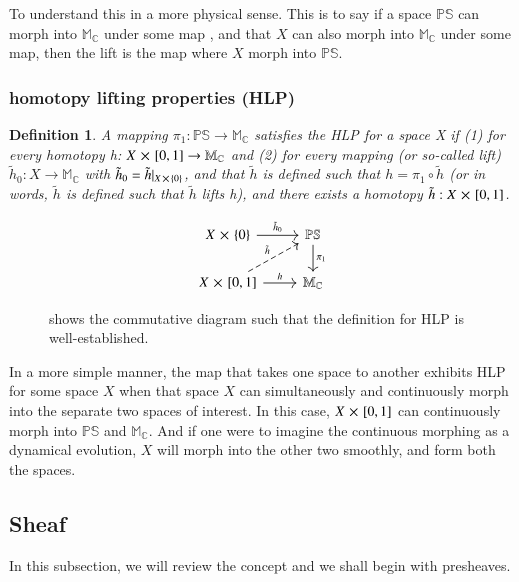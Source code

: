 \documentclass{article}
\newtheorem{definition}{Definition}
\begin{document}
To understand this in a more physical sense. This is to say if a space $
\mathbb{PS} $ can morph into $ \mathbb{M_{C}} $ under some map , and that $ X $ can also
morph into $\mathbb{M_{C}}$ under some map, then the lift is the map where
$X$ morph into $\mathbb{PS}$.  
\subsubsection{homotopy lifting properties (HLP)}%
  \label{sub: homotopy lifting properties (HLP)}
  \begin{definition}
    A mapping $\pi_1: \mathbb{PS} \to \mathbb{M_{C}}$ satisfies the HLP
    for a space X if (1) for every homotopy h:  $ X \cross [0,1] \to
    \mathbb{M_{C}} $
    and (2) for every mapping (or so-called lift) $\tilde h_0: X \to
    \mathbb{M_{C}}$ with $  \tilde h_0 =  \tilde h |_{X \cross \{0\}}
    $, and that $ \tilde h $ is defined such that $ h = \pi_1 \circ \tilde h
    $ (or in words, $\tilde h$ is defined such that $\tilde h$ lifts
    h), and there exists a homotopy $ \tilde h: X \cross [0,1] $.   
      \end{definition}
 \begin{figure}[h!]
\begin{center}
    \[ \begin{tikzcd}
      X \cross \{0\} \arrow{r}{\tilde h_0} & \mathbb{PS} \arrow{d}{\pi_1} \\%
      X \cross [0,1] \arrow{r}{h} \arrow[dashed]{ru}{\tilde h}&
      \mathbb{M_{C}} 
\end{tikzcd}
\]
\end{center}
  \caption{shows the commutative diagram such that the definition for
  HLP is well-established.}
\label{fig: commutative diagram of lift}
\end{figure}

In a more simple manner, the map that takes one space to another exhibits HLP for some
space $X$ when that space $X$ can simultaneously and continuously morph into
the separate two spaces of interest. In this case, $X \cross [0,1]$ can
continuously morph into $\mathbb{PS}$ and $ \mathbb{M_{C}} $. And if one were
to imagine the continuous morphing as a dynamical evolution, $X$ will morph
into the other two smoothly, and form both the spaces. 

\subsection{Sheaf}%
  \label{sub: Sheaf Cohomology}
  In this subsection, we will review the concept and we shall begin with
  presheaves.
\end{document}
